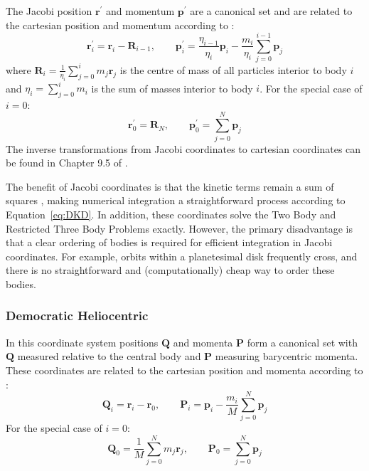 The Jacobi position $\textbf{r}^{\prime}$ and momentum $\textbf{p}^{\prime}$ are a canonical set and are related to the cartesian position and momentum according to \citep{SSD1999}:
\begin{equation}
\textbf{r}^{\prime}_i = \textbf{r}_i - \textbf{R}_{i-1}, \qquad
\textbf{p}^{\prime}_i = \frac{\eta_{i-1}}{\eta_i}\textbf{p}_i - \frac{m_i}{\eta_i}\sum_{j=0}^{i-1} \textbf{p}_j
\end{equation}
where $\textbf{R}_i = \frac{1}{\eta_i} \sum_{j=0}^i m_j\textbf{r}_j$ is the centre of mass of all particles interior to body $i$ and $\eta_i = \sum_{j=0}^i m_i$ is the sum of masses interior to body $i$.
For the special case of $i=0$:
\begin{equation}
\textbf{r}^{\prime}_0 = \textbf{R}_{N}, \qquad
\textbf{p}^{\prime}_0 = \sum_{j=0}^{N} \textbf{p}_j
\end{equation}
The inverse transformations from Jacobi coordinates to cartesian coordinates can be found in Chapter 9.5 of \citet{SSD1999}.

The benefit of Jacobi coordinates is that the kinetic terms remain a sum of squares \citep{Plummer1918}, making numerical integration a straightforward process according to Equation~\ref{eq:DKD}. 
In addition, these coordinates solve the Two Body and Restricted Three Body Problems exactly. 
However, the primary disadvantage is that a clear ordering of bodies is required for efficient integration in Jacobi coordinates. 
For example, orbits within a planetesimal disk frequently cross, and there is no straightforward and (computationally) cheap way to order these bodies. 

\subsubsection{Democratic Heliocentric}
\label{sec:DH}
In this coordinate system positions $\textbf{Q}$ and momenta $\textbf{P}$ form a canonical set with $\textbf{Q}$ measured relative to the central body and $\textbf{P}$ measuring barycentric momenta.
These coordinates are related to the cartesian position and momenta according to \citep{Duncan1998}:
\begin{equation}
\textbf{Q}_i = \textbf{r}_i - \textbf{r}_0, \qquad
\textbf{P}_i = \textbf{p}_i - \frac{m_i}{M}\sum_{j=0}^N \textbf{p}_j
\end{equation}
For the special case of $i=0$:
\begin{equation}
\textbf{Q}_0 = \frac{1}{M} \sum_{j=0}^N m_j \textbf{r}_j, \qquad
\textbf{P}_0 = \sum_{j=0}^{N} \textbf{p}_j
\end{equation}

